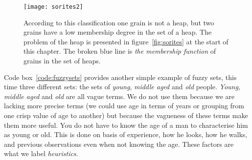 \documentclass[11pt,fleqn]{book} %
\begin{document}
\begin{figure}[ht]
\centering
\texttt{[image: sorites2]}
\caption{According to this classification one grain is not a heap, but two grains have a low membership degree in the set of a heap. The problem of the heap is presented in figure~\ref{fig:sorites} at the start of this chapter. The broken blue line is \textit{the membership function} of grains in the set of heaps.}
\label{fig:sorites2}
\end{figure}

Code box~\ref{code:fuzzysets} provides another simple example of fuzzy sets, this time three different sets: the sets of \textit{young}, \textit{middle aged} and \textit{old} people. \textit{Young}, \textit{middle aged} and \textit{old} are all vague terms. We do not use them because we are lacking more precise terms (we could use age in terms of years or grouping from one crisp value of age to another) but because the vagueness of these terms make them more useful. You do not have to know the age of a man to characterise him as young or old. This is done on basis of experience, how he looks, how he walks, and previous observations even when not knowing the age. These factors are what we label \textit{heuristics}.
\end{document}
